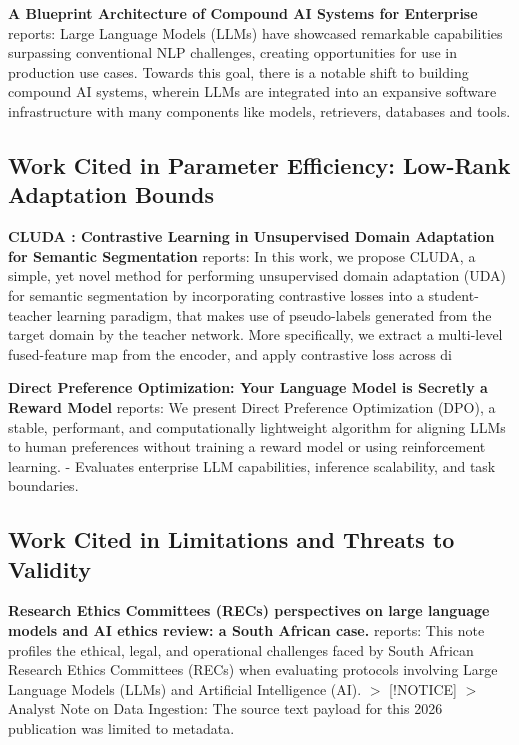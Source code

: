 \documentclass[11pt,a4paper]{article}
\begin{document}
\textbf{A Blueprint Architecture of Compound AI Systems for Enterprise} \cite{arxiv_2406_00584} reports: Large Language Models (LLMs) have showcased remarkable capabilities surpassing conventional NLP challenges, creating opportunities for use in production use cases. Towards this goal, there is a notable shift to building compound AI systems, wherein LLMs are integrated into an expansive software infrastructure with many components like models, retrievers, databases and tools.


\subsection{Work Cited in Parameter Efficiency: Low-Rank Adaptation Bounds}


\textbf{CLUDA : Contrastive Learning in Unsupervised Domain Adaptation for Semantic Segmentation} \cite{arxiv_2208_14227} reports: In this work, we propose CLUDA, a simple, yet novel method for performing unsupervised domain adaptation (UDA) for semantic segmentation by incorporating contrastive losses into a student-teacher learning paradigm, that makes use of pseudo-labels generated from the target domain by the teacher network. More specifically, we extract a multi-level fused-feature map from the encoder, and apply contrastive loss across di

\textbf{Direct Preference Optimization: Your Language Model is Secretly a Reward Model} \cite{arxiv_2305_18290} reports: We present Direct Preference Optimization (DPO), a stable, performant, and computationally lightweight algorithm for aligning LLMs to human preferences without training a reward model or using reinforcement learning. - Evaluates enterprise LLM capabilities, inference scalability, and task boundaries.


\subsection{Work Cited in Limitations and Threats to Validity}


\textbf{Research Ethics Committees (RECs) perspectives on large language models and AI ethics review: a South African case.} \cite{pubmed_42380865} reports: This note profiles the ethical, legal, and operational challenges faced by South African Research Ethics Committees (RECs) when evaluating protocols involving Large Language Models (LLMs) and Artificial Intelligence (AI). $>$ [!NOTICE] $>$ Analyst Note on Data Ingestion: The source text payload for this 2026 publication was limited to metadata.
\end{document}
